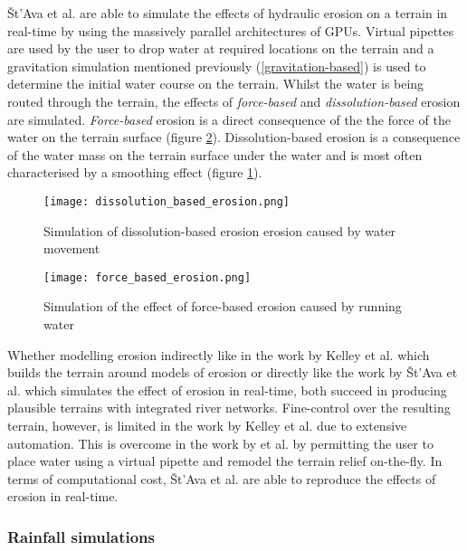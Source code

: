 Št'Ava et al. \cite{StAva2008} are able to simulate the effects of hydraulic erosion on a terrain in real-time by using the massively parallel architectures of GPUs. Virtual pipettes are used by the user to drop water at required locations on the terrain and a gravitation simulation mentioned previously (\ref{gravitation-based}) is used to determine the initial water course on the terrain. Whilst the water is being routed through the terrain, the effects of \textit{force-based} and \textit{dissolution-based} erosion are simulated. \textit{Force-based} erosion is a direct consequence of the the force of the water on the terrain surface (figure \ref{force-based erosion}). Dissolution-based erosion is a consequence of the water mass on the terrain surface under the water and is most often characterised by a smoothing effect (figure \ref{dissolution_based_erosion-based erosion}).\\

\begin{figure}[h]
  \centering
	\label{dissolution_based_erosion-based erosion}
	\texttt{[image: dissolution\_based\_erosion.png]}
	\caption{Simulation of dissolution-based erosion erosion caused by water movement\cite{StAva2008}}
\end{figure}

\begin{figure}[h]
  \centering
	\label{force-based erosion}
	\texttt{[image: force\_based\_erosion.png]}
	\caption{Simulation of the effect of force-based erosion caused by running water \cite{StAva2008}}
\end{figure}

Whether modelling erosion indirectly like in the work by Kelley et al. \cite{Kelley1988} which builds the terrain around models of erosion or directly like the work by Št'Ava et al. \cite{StAva2008} which simulates the effect of erosion in real-time, both succeed in producing plausible terrains with integrated river networks. Fine-control over the resulting terrain, however, is limited in the work by Kelley et al. \cite{Kelley1988} due to extensive automation. This is overcome in the work by \cite{StAva2008} et al. by permitting the user to place water using a virtual pipette and remodel the terrain relief on-the-fly. In terms of computational cost, Št'Ava et al. \cite{StAva2008} are able to reproduce the effects of erosion in real-time.  

\subsubsection{Rainfall simulations}

